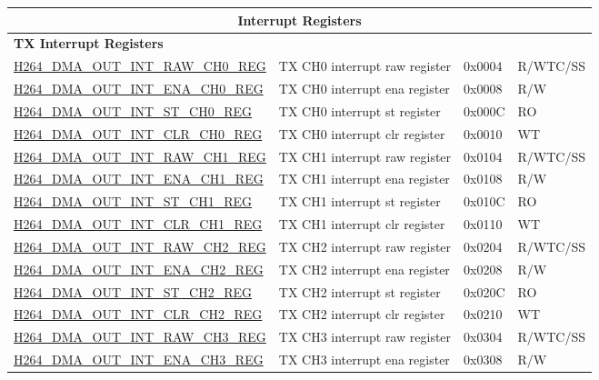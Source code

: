 \begin{longtable}{ | p{7.5cm} | p{5.7cm} | p{1.2cm} | p{1.5cm} | }
\multicolumn{4}{|c|}{\cellcolor{gray!15}\textbf{Interrupt Registers}} \\ \hline
\multicolumn{4}{|l|}{\textbf{TX Interrupt Registers}} \\ \hline
\hyperref[regdesc:H264DMAOUTINTRAWCH0REG]{H264\_DMA\_OUT\_INT\_RAW\_CH0\_REG} & TX CH0  interrupt raw register & 0x0004 & R/WTC/SS \\ \hline
\hyperref[regdesc:H264DMAOUTINTENACH0REG]{H264\_DMA\_OUT\_INT\_ENA\_CH0\_REG} & TX CH0  interrupt ena register & 0x0008 & R/W \\ \hline
\hyperref[regdesc:H264DMAOUTINTSTCH0REG]{H264\_DMA\_OUT\_INT\_ST\_CH0\_REG} & TX CH0  interrupt st register & 0x000C & RO \\ \hline
\hyperref[regdesc:H264DMAOUTINTCLRCH0REG]{H264\_DMA\_OUT\_INT\_CLR\_CH0\_REG} & TX CH0  interrupt clr register & 0x0010 & WT \\ \hline
\hyperref[regdesc:H264DMAOUTINTRAWCH1REG]{H264\_DMA\_OUT\_INT\_RAW\_CH1\_REG} & TX CH1  interrupt raw register & 0x0104 & R/WTC/SS \\ \hline
\hyperref[regdesc:H264DMAOUTINTENACH1REG]{H264\_DMA\_OUT\_INT\_ENA\_CH1\_REG} & TX CH1  interrupt ena register & 0x0108 & R/W \\ \hline
\hyperref[regdesc:H264DMAOUTINTSTCH1REG]{H264\_DMA\_OUT\_INT\_ST\_CH1\_REG} & TX CH1  interrupt st register & 0x010C & RO \\ \hline
\hyperref[regdesc:H264DMAOUTINTCLRCH1REG]{H264\_DMA\_OUT\_INT\_CLR\_CH1\_REG} & TX CH1  interrupt clr register & 0x0110 & WT \\ \hline
\hyperref[regdesc:H264DMAOUTINTRAWCH2REG]{H264\_DMA\_OUT\_INT\_RAW\_CH2\_REG} & TX CH2  interrupt raw register & 0x0204 & R/WTC/SS \\ \hline
\hyperref[regdesc:H264DMAOUTINTENACH2REG]{H264\_DMA\_OUT\_INT\_ENA\_CH2\_REG} & TX CH2  interrupt ena register & 0x0208 & R/W \\ \hline
\hyperref[regdesc:H264DMAOUTINTSTCH2REG]{H264\_DMA\_OUT\_INT\_ST\_CH2\_REG} & TX CH2  interrupt st register & 0x020C & RO \\ \hline
\hyperref[regdesc:H264DMAOUTINTCLRCH2REG]{H264\_DMA\_OUT\_INT\_CLR\_CH2\_REG} & TX CH2  interrupt clr register & 0x0210 & WT \\ \hline
\hyperref[regdesc:H264DMAOUTINTRAWCH3REG]{H264\_DMA\_OUT\_INT\_RAW\_CH3\_REG} & TX CH3  interrupt raw register & 0x0304 & R/WTC/SS \\ \hline
\hyperref[regdesc:H264DMAOUTINTENACH3REG]{H264\_DMA\_OUT\_INT\_ENA\_CH3\_REG} & TX CH3  interrupt ena register & 0x0308 & R/W \\ \hline

\end{longtable}
